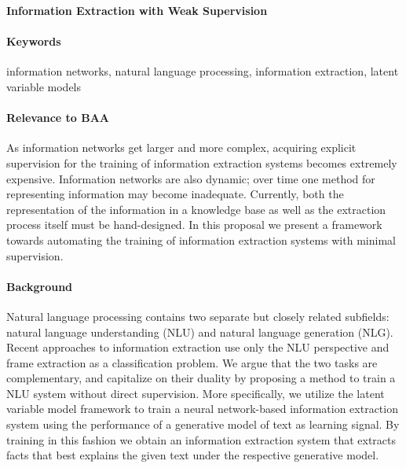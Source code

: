 \documentclass[11pt]{article}
\begin{document}

\begin{center}
\textbf{Information Extraction with Weak Supervision}
\end{center}

\begin{comment}
Spectrum from hard attention => hard segmental => HSMM for generative model, coverage / recall
Should we go into HSMM??? or is hard segmental attention enough

composition function = categorical over two entries of x

structured attention for IE posterior?
\end{comment}

\paragraph{Keywords}
information networks, natural language processing, information extraction,
latent variable models

\paragraph{Relevance to BAA}
As information networks get larger and more complex,
acquiring explicit supervision for the training of information extraction systems
becomes extremely expensive.
Information networks are also dynamic;
over time one method for representing information may become inadequate.
Currently, both the representation of the information in a knowledge base
as well as the extraction process itself must be hand-designed.
In this proposal we present a framework towards automating the
training of information extraction systems with minimal supervision.

\paragraph{Background}
Natural language processing contains two separate but
closely related subfields: natural language understanding (NLU) and natural language
generation (NLG).
Recent approaches to information extraction use only the NLU perspective
and frame extraction as a classification problem.
We argue that the two tasks are complementary,
and capitalize on their duality by proposing a method to train a NLU system
without direct supervision.
More specifically, we utilize the latent variable model framework to train a 
neural network-based information
extraction system using the performance of a generative model of text as learning signal.
By training in this fashion we obtain an information extraction system
that extracts facts that best explains the given text under the respective generative model.
\end{document}
